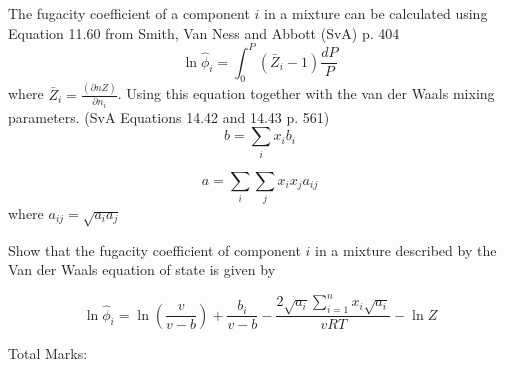 \documentclass[12pt, A4paper]{article}
\newcounter{parameters}
\begin{document}
The fugacity coefficient of a component $i$ in a mixture can be calculated using Equation 11.60 from Smith, Van Ness and Abbott (SvA) p. 404
$$
\ln{\hat{\phi}_i} = \int^P_0 (\bar{Z}_i - 1) \frac{d P}{P}
$$
where $\bar{Z}_i  = \frac{\left( \partial n Z \right)}{\partial n_i}$. Using this equation together with the van der Waals mixing parameters. (SvA Equations 14.42 and 14.43 p. 561)
$$
b = \sum_{i} x_i b_i
$$

$$
a = \sum_{i}\sum_{j} x_i x_j a_{ij}
$$
 where $a_{ij} = \sqrt{a_i a_j}$
 


 Show that the fugacity coefficient of component $i$ in a mixture described by the Van der Waals equation of state is given by
 
$$
\ln{\hat{\phi}_i} = \ln{\left(\frac{v}{v - b} \right)}+ \frac{b_i}{v - b} - \frac{2 \sqrt{a_i} \sum_{i = 1}^n x_i \sqrt{a_i} }{v R T} - \ln{Z}
$$

 
\begin{centering}
Total Marks: \\
\end{centering}


%

\end{document}
